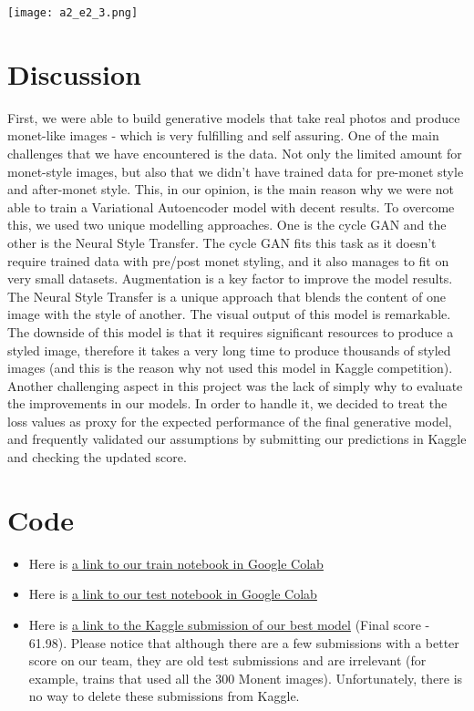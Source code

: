 \documentclass{article}
\begin{document}
\begin{center}
    \texttt{[image: a2\_e2\_3.png]}
\end{center}

\section{Discussion}
First, we were able to build generative models that take real photos and produce monet-like images - which is very fulfilling and self assuring.
One of the main challenges that we have encountered is the data. Not only the limited amount for monet-style images, but also that we didn’t have trained data for pre-monet style and after-monet style. This, in our opinion, is the main reason why we were not able to train a Variational Autoencoder model with decent results.
To overcome this, we used two unique modelling approaches. One is the cycle GAN and the other is the Neural Style Transfer. The cycle GAN fits this task as it doesn’t require trained data with pre/post monet styling, and it also manages to fit on very small datasets. Augmentation is a key factor to improve the model results.
The Neural Style Transfer is a unique approach that blends the content of one image with the style of another. The visual output of this model is remarkable. The downside of this model is that it requires significant resources to produce a styled image, therefore it takes a very long time to produce thousands of styled images (and this is the reason why not used this model in Kaggle competition).
Another challenging aspect in this project was the lack of simply why to evaluate the improvements in our models. In order to handle it, we decided to treat the loss values as proxy for the expected performance of the final generative model, and frequently validated our assumptions by submitting our predictions in Kaggle and checking the updated score.


\section{Code}
\begin{itemize}
    \item Here is \href{https://colab.research.google.com/drive/1HVOYKNO_Wr5gIPydsSINsGEhfxGbsWXr?usp=sharing#scrollTo=v9tkeXavuGw4}{a link to our train notebook in Google Colab}
    \item Here is \href{https://colab.research.google.com/drive/1bUns3iR8ry2VXhK1my2tNdfTAdPVunqJ#scrollTo=LEw570hXlqdq}{a link to our test notebook in Google Colab}
    \item Here is \href{https://www.kaggle.com/code/itaysstorage/notebookaffcb41770?scriptVersionId=119540087}{a link to the Kaggle submission of our best model} (Final score - 61.98). Please notice that although there are a few submissions with a better score on our team, they are old test submissions and are irrelevant (for example, trains that used all the 300 Monent images). Unfortunately, there is no way to delete these submissions from Kaggle.
\end{itemize}




\end{document}
